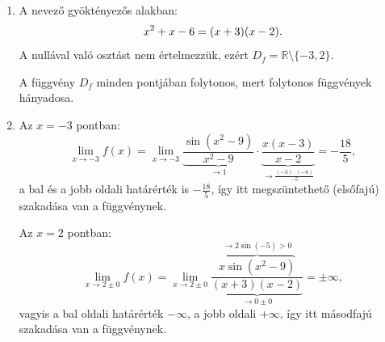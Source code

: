 \documentclass[11pt]{scrartcl}
\begin{document}
\begin{enumerate}
	\item A nevező gyöktényezős alakban:
	      \[
		      x^2 + x - 6 = (x + 3)(x - 2)
		      \text.
	      \]
	      A nullával való osztást nem értelmezzük, ezért $D_f = \mathbb{R}
		      \setminus \{-3, 2\}$.

	      A függvény $D_f$ minden pontjában folytonos, mert folytonos függvények
	      hányadosa.

	\item Az $x = -3$ pontban:
	      \[
		      \lim_{x \to -3} f(x)
		      = \lim_{x \to -3}
		      \underbrace{\frac{\sin\left(x^2 - 9\right)}{x^2 - 9}}_{\to 1} \cdot
		      \underbrace{\frac{x (x - 3)}{x - 2}}_{\to \frac{(-3) \cdot (-6)}{-5}}
		      = -\frac{18}{5},
	      \]
	      a bal és a jobb oldali határérték is $-\frac{18}{5}$, így itt
	      megszüntethető (elsőfajú) szakadása van a függvénynek.

	      Az $x = 2$ pontban:
	      \[
		      \lim_{x \to 2 \pm 0} f(x)
		      = \lim_{x \to 2 \pm 0}
		      \frac{
			      \overbrace{x \sin\left(x^2 - 9\right)}^{\to 2 \sin(-5) > 0}
		      }{
			      \underbrace{(x + 3)(x - 2)}_{\to 0 \pm 0}
		      }
		      = \pm \infty,
	      \]
	      vagyis a bal oldali határérték $-\infty$, a jobb oldali $+\infty$, így
	      itt másodfajú szakadása van a függvénynek.
\end{enumerate}
\end{document}

